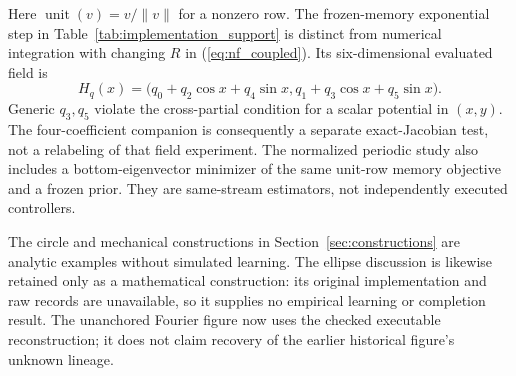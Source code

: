\documentclass[journal]{IEEEtran}
\begin{document}
Here $\operatorname{unit}(v)=v/\|v\|$ for a nonzero row.
The frozen-memory exponential step in Table~\ref{tab:implementation_support}
is distinct from numerical integration with changing $R$ in
(\ref{eq:nf_coupled}). Its six-dimensional evaluated field is
\begin{equation}
 H_q(x)=\bigl(q_0+q_2\cos x+q_4\sin x,
                q_1+q_3\cos x+q_5\sin x\bigr).
\end{equation}
Generic $q_3,q_5$ violate the cross-partial condition for a scalar
potential in $(x,y)$. The four-coefficient companion is consequently a
separate exact-Jacobian test, not a relabeling of that field experiment.
The normalized periodic study also includes a bottom-eigenvector minimizer
of the same unit-row memory objective and a frozen prior. They are
same-stream estimators, not independently executed controllers.

The circle and mechanical constructions in
Section~\ref{sec:constructions} are analytic examples without simulated
learning. The ellipse discussion is likewise retained only as a mathematical
construction: its original implementation and raw records are unavailable,
so it supplies no empirical learning or completion result. The unanchored
Fourier figure now uses the checked executable reconstruction; it does not
claim recovery of the earlier historical figure's unknown lineage.
\end{document}

